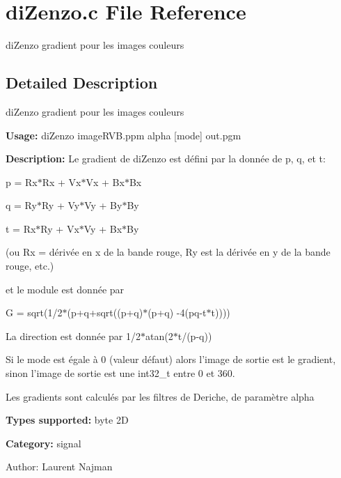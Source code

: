 \section{di\-Zenzo.c File Reference}
\label{diZenzo_8c}
di\-Zenzo gradient pour les images couleurs 



\subsection{Detailed Description}
di\-Zenzo gradient pour les images couleurs 

{\bf Usage:} di\-Zenzo image\-RVB.ppm alpha [mode] out.pgm

{\bf Description:} Le gradient de di\-Zenzo est d\'{e}fini par la donn\'{e}e de p, q, et t:

p = Rx$\ast$Rx + Vx$\ast$Vx + Bx$\ast$Bx

q = Ry$\ast$Ry + Vy$\ast$Vy + By$\ast$By

t = Rx$\ast$Ry + Vx$\ast$Vy + Bx$\ast$By

(ou Rx = d\'{e}riv\'{e}e en x de la bande rouge, Ry est la d\'{e}riv\'{e}e en y de la bande rouge, etc.)

et le module est donn\'{e}e par

G = sqrt(1/2$\ast$(p+q+sqrt((p+q)$\ast$(p+q) -4(pq-t$\ast$t))))

La direction est donn\'{e}e par 1/2$\ast$atan(2$\ast$t/(p-q))

Si le mode est \'{e}gale \`{a} 0 (valeur d\'{e}faut) alors l'image de sortie est le gradient, sinon l'image de sortie est une int32\_\-t entre 0 et 360.

Les gradients sont calcul\'{e}s par les filtres de Deriche, de param\`{e}tre alpha

{\bf Types supported:} byte 2D

{\bf Category:} signal

\begin{Desc}
\item[Author:]Laurent Najman \end{Desc}
